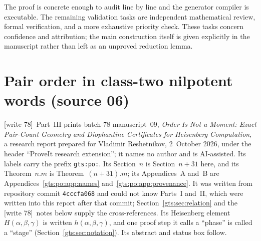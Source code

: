 \documentclass[11pt,letterpaper]{article}
\theoremstyle{definition}
\theoremstyle{remark}
\newcommand{\wtagb}{\textup{[write 78]}}
\begin{document}
The proof is concrete enough to audit line by line and the generator
compiler is executable. The remaining validation tasks are independent
mathematical review, formal verification, and a more exhaustive priority
check. These tasks concern confidence and attribution; the main
construction itself is given explicitly in the manuscript rather than
left as an unproved reduction lemma.

\part{Pair order in class-two nilpotent words (source 06)}\label{gts:part:po}

\noindent\wtagb\ Part~III prints batch-78 manuscript~09, \emph{Order Is Not a Moment: Exact Pair-Count Geometry and Diophantine Certificates for Heisenberg Computation}, a research report prepared for Vladimir Reshetnikov, 2~October 2026, under the header ``ProveIt research extension''; it names no author and is AI-assisted. Its labels carry the prefix \texttt{gts:po:}. Its Section~$n$ is Section~$n+31$ here, and its Theorem~$n.m$ is Theorem~$(n+31).m$; its Appendices~A and~B are Appendices~\ref{gts:po:app:names} and~\ref{gts:po:app:provenance}. It was written from repository commit \texttt{4cccfa068} and could not know Parts~I and~II, which were written into this report after that commit; Section~\ref{gts:sec:relation} and the \wtagb\ notes below supply the cross-references. Its Heisenberg element $H(\alpha,\beta,\gamma)$ is written $h(\alpha,\beta,\gamma)$, and one proof step it calls a ``phase'' is called a ``stage'' (Section~\ref{gts:sec:notation}). Its abstract and status box follow.
\end{document}
